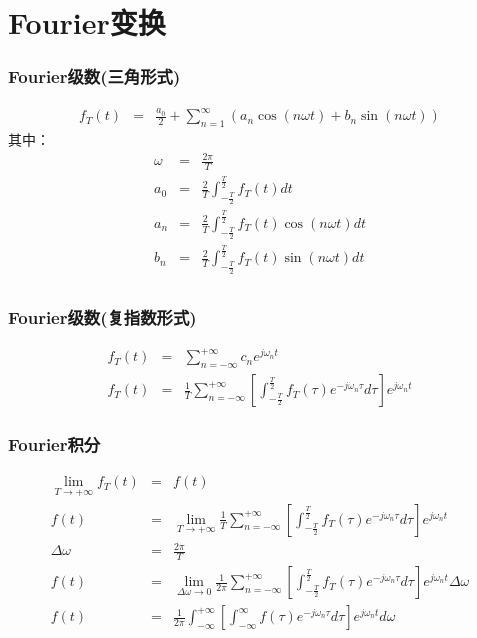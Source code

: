\documentclass{beamer}
\begin{document}
\section{Fourier变换}
\label{sec-5}
\begin{frame}
\frametitle{Fourier级数(三角形式)}
\label{sec-5-1}

\begin{eqnarray*}
f_T(t) & =& \frac{a_0}{2}+\sum_{n=1}^{\infty}(a_n\cos(n\omega t)+b_n\sin(n\omega t))  
\end{eqnarray*}
其中：
\begin{eqnarray*}
\omega & =& \frac{2\pi}{T}\\
a_0 &=& \frac{2}{T}\int_{-\frac{T}{2}}^{\frac{T}{2}}f_T(t)dt \\
a_n &=& \frac{2}{T}\int_{-\frac{T}{2}}^{\frac{T}{2}}f_T(t)\cos(n\omega t)dt \\
b_n &=& \frac{2}{T}\int_{-\frac{T}{2}}^{\frac{T}{2}}f_T(t)\sin(n\omega t)dt \\
\end{eqnarray*}
\end{frame}
\begin{frame}
\frametitle{Fourier级数(复指数形式)}
\label{sec-5-2}

\begin{eqnarray*}
f_T(t) & = & \sum_{n=-\infty}^{+ \infty}c_n e^{j\omega_n t} \\
f_T(t) & = & \frac{1}{T}\sum_{n=-\infty}^{+\infty}\left[ \int_{- \frac{T}{2} }^{\frac{T}{2}}f_T(\tau)e^{-j\omega_n\tau}d\tau\right] e^{j\omega_n t} 
\end{eqnarray*}
\end{frame}
\begin{frame}
\frametitle{Fourier积分}
\label{sec-5-3}

\begin{eqnarray*}
\lim_{T\rightarrow+\infty}f_T(t) &=& f(t) \\
f(t) & = & \lim_{T\rightarrow+\infty}\frac{1}{T}\sum_{n=-\infty}^{+\infty}\left[ \int_{- \frac{T}{2} }^{\frac{T}{2}}f_T(\tau)e^{-j\omega_n\tau}d\tau\right] e^{j\omega_n t} \\
\Delta\omega &=& \frac{2\pi}{T} \\
f(t) & = & \lim_{\Delta\omega\rightarrow 0}\frac{1}{2\pi}\sum_{n=-\infty}^{+ \infty}\left[ \int_{- \frac{T}{2} }^{\frac{T}{2}}f_T(\tau)e^{-j\omega_n\tau}d\tau\right] e^{j\omega_n t}\Delta\omega \\
f(t) & = & \frac{1}{2\pi}\int_{-\infty}^{+\infty}\left[ \int_{-\infty }^{\infty}f(\tau)e^{-j\omega_n\tau}d\tau\right] e^{j\omega_n t}d\omega
\end{eqnarray*}
\end{frame}
\end{document}
